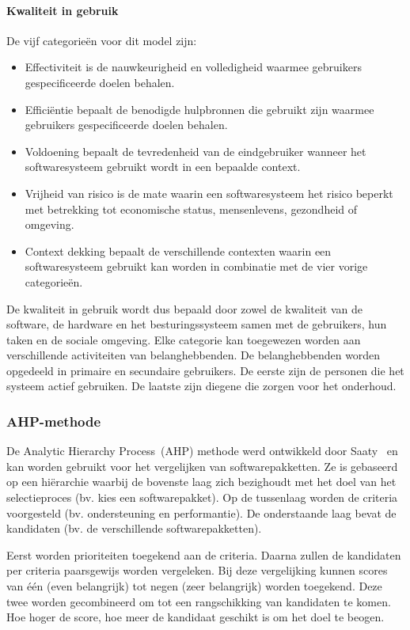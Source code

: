 \paragraph{Kwaliteit in gebruik}
De vijf categorieën voor dit model zijn:
\begin{itemize}
 \item Effectiviteit is de nauwkeurigheid en volledigheid waarmee gebruikers gespecificeerde doelen behalen.
 \item Efficiëntie bepaalt de benodigde hulpbronnen die gebruikt zijn waarmee gebruikers gespecificeerde doelen behalen.
 \item Voldoening bepaalt de tevredenheid van de eindgebruiker wanneer het softwaresysteem gebruikt wordt in een bepaalde context.
 \item Vrijheid van risico is de mate waarin een softwaresysteem het risico beperkt met betrekking tot economische status, mensenlevens, gezondheid of omgeving.
 \item Context dekking bepaalt de verschillende contexten waarin een softwaresysteem gebruikt kan worden in combinatie met de vier vorige categorieën.
\end{itemize}
De kwaliteit in gebruik wordt dus bepaald door zowel de kwaliteit van de software,  de hardware en het besturingssysteem samen met de gebruikers, hun taken en de sociale omgeving.  
Elke categorie kan toegewezen worden aan verschillende activiteiten van belanghebbenden. 
De belanghebbenden worden opgedeeld in primaire en secundaire gebruikers.  
De eerste zijn de personen die het systeem actief gebruiken. 
De laatste zijn diegene die zorgen voor het onderhoud.

\subsubsection{AHP-methode}
\label{sec:vergelijken-ahp}
De Analytic Hierarchy Process~(AHP) methode werd ontwikkeld door Saaty~\cite{Saaty1980} en kan worden gebruikt voor het vergelijken van softwarepakketten.
Ze is gebaseerd op een hiërarchie waarbij de bovenste laag zich bezighoudt met het doel van het selectieproces (bv. kies een softwarepakket).
Op de tussenlaag worden de criteria voorgesteld (bv. ondersteuning en performantie).
De onderstaande laag bevat de kandidaten (bv. de verschillende softwarepakketten).

Eerst worden prioriteiten toegekend aan de criteria.
Daarna zullen de kandidaten per criteria paarsgewijs worden vergeleken.
Bij deze vergelijking kunnen scores van één (even belangrijk) tot negen (zeer belangrijk) worden toegekend.
Deze twee worden gecombineerd om tot een rangschikking van kandidaten te komen.
Hoe hoger de score, hoe meer de kandidaat geschikt is om het doel te beogen.

